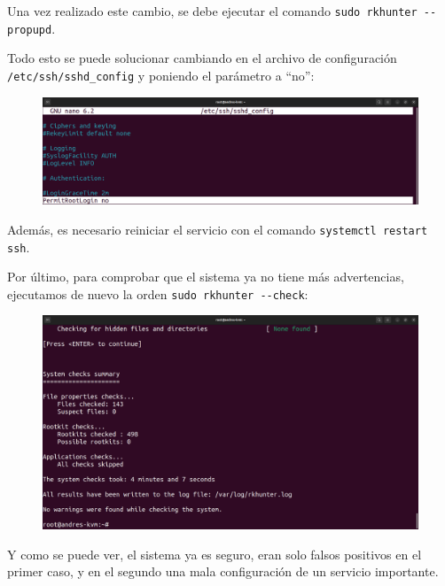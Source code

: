 \documentclass{article}
\begin{document}
Una vez realizado este cambio, se debe ejecutar el comando \verb|sudo rkhunter --propupd|.


Todo esto se puede solucionar cambiando en el archivo de configuración \verb|/etc/ssh/sshd_config| y poniendo el parámetro a ``no'':

\begin{figure}[H]
    \includegraphics[width=\textwidth]{imagenes/sshpermit.png}
\end{figure}

Además, es necesario reiniciar el servicio con el comando \verb|systemctl restart ssh|.

Por último, para comprobar que el sistema ya no tiene más advertencias, ejecutamos de nuevo la orden \verb|sudo rkhunter --check|:

\begin{figure}[H]
    \includegraphics[width=\textwidth]{imagenes/rkhunterokk.png}
\end{figure}

Y como se puede ver, el sistema ya es seguro, eran solo falsos positivos en el primer caso, y en el segundo una mala configuración de un servicio importante.
\end{document}
